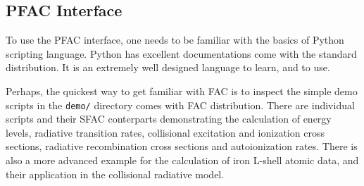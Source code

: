 \documentclass[twoside,letterpaper]{refrep}
\begin{document}
\subsection{PFAC Interface}
To use the PFAC interface, one needs to be familiar with the basics of Python
scripting language. Python has excellent documentations come with the standard
distribution. It is an extremely well designed language to learn, and to use.

Perhaps, the quickest way to get familiar with FAC is to inspect the simple
demo scripts in the \verb|demo/| directory comes with FAC distribution. There
are individual scripts and their SFAC conterparts demonstrating the
calculation of energy levels, radiative transition rates, collisional
excitation and ionization cross sections, radiative recombination cross
sections and autoionization rates. There is also a more advanced example for
the calculation of iron L-shell atomic data, and their application in the
collisional radiative model.
\end{document}

